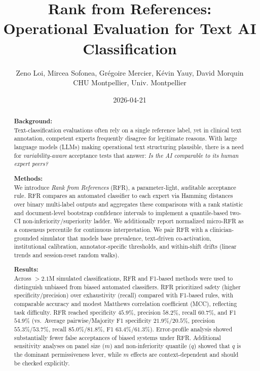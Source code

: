 \documentclass[12pt]{article}
\begin{document}
\title{Rank from References: \\Operational Evaluation for Text AI Classification}
\author{Zeno Loi, Mircea Sofonea, Grégoire Mercier, Kévin Yauy, David Morquin\\
CHU Montpellier, Univ. Montpellier}
\date{2026-04-21}

\maketitle

\begin{abstract}
\textbf{Background:}\\
Text-classification evaluations often rely on a single reference label, yet in clinical text annotation, competent experts frequently disagree for legitimate reasons. With large language models (LLMs) making operational text structuring plausible, there is a need for \emph{variability-aware} acceptance tests that answer: \emph{Is the AI comparable to its human expert peers?}

\textbf{Methods:}\\
We introduce \textit{Rank from References} (RFR), a parameter-light, auditable acceptance rule. RFR compares an automated classifier to each expert via Hamming distances over binary multi-label outputs and aggregates these comparisons with a rank statistic and document-level bootstrap confidence intervals to implement a quantile-based two-CI non-inferiority/superiority ladder. We additionally report normalized micro-RFR as a consensus percentile for continuous interpretation. We pair RFR with a clinician-grounded simulator that models base prevalence, text-driven co-activation, institutional calibration, annotator-specific thresholds, and within-shift drifts (linear trends and session-reset random walks).

\textbf{Results:}\\
Across \(>2.1\)M simulated classifications, RFR and F1-based methods were used to distinguish unbiased from biased automated classifiers. RFR prioritized safety (higher specificity/precision) over exhaustivity (recall) compared with F1-based rules, with comparable accuracy and modest Matthews correlation coefficient (MCC), reflecting task difficulty. RFR reached specificity \(45.9\%\), precision \(58.2\%\), recall \(60.7\%\), and F1 \(54.9\%\) (vs.\ Average pairwise/Majority F1 specificity \(21.9\%/20.5\%\), precision \(55.3\%/53.7\%\), recall \(85.0\%/81.8\%\), F1 \(63.4\%/61.3\%\)). Error-profile analysis showed substantially fewer false acceptances of biased systems under RFR. Additional sensitivity analyses on panel size (\(m\)) and non-inferiority quantile (\(q\)) showed that \(q\) is the dominant permissiveness lever, while \(m\) effects are context-dependent and should be checked explicitly.


\end{abstract}
\end{document}

